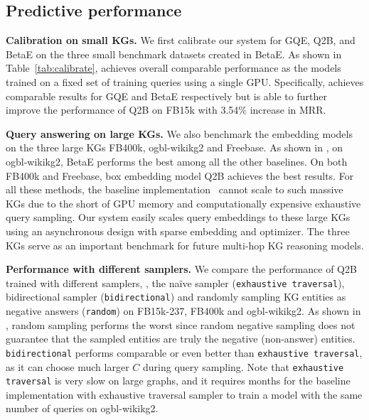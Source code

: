 \subsection{Predictive performance}
\textbf{Calibration on small KGs.}
We first calibrate our \modelshort system for GQE, Q2B, and BetaE on the three small benchmark datasets created in BetaE. As shown in Table~\ref{tab:calibrate}, \modelshort achieves overall comparable performance as the models trained on a fixed set of training queries using a single GPU. Specifically, \modelshort achieves comparable results for GQE and BetaE respectively but is able to further improve the performance of Q2B on FB15k with 3.54\% increase in MRR. 





\textbf{Query answering on large KGs.}
We also benchmark the embedding models on the three large KGs FB400k, ogbl-wikikg2 and Freebase. As shown in , on ogbl-wikikg2, BetaE performs the best among all the other baselines. On both FB400k and Freebase, box embedding model Q2B achieves the best results. For all these methods, the baseline implementation~\cite{kgreasoning} cannot scale to such massive KGs due to the short of GPU memory and computationally expensive exhaustive query sampling. 
Our system \modelshort easily scales query embeddings to these large KGs using an asynchronous design with sparse embedding and optimizer. 
% 
The three KGs serve as an important benchmark for future multi-hop KG reasoning models.


\textbf{Performance with different samplers.}
We compare the performance of Q2B trained with different samplers, \ie, the na\"ive sampler (\texttt{exhaustive traversal}), bidirectional sampler (\texttt{bidirectional}) and randomly sampling KG entities as negative answers (\texttt{random}) on FB15k-237, FB400k and ogbl-wikikg2. As shown in , random sampling performs the worst since random negative sampling does not guarantee that the sampled entities are truly the negative (non-answer) entities. \texttt{bidirectional} performs comparable or even better than \texttt{exhaustive traversal}, as it can choose much larger $C$ during query sampling. Note that \texttt{exhaustive traversal} is very slow on large graphs, and it requires months for the baseline implementation with exhaustive traversal sampler to train a model with the same number of queries on ogbl-wikikg2.
